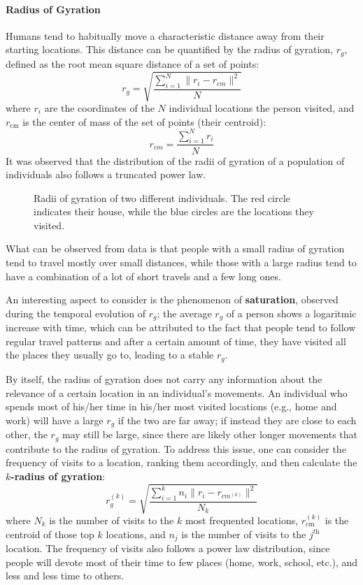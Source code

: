 \paragraph{Radius of Gyration}
Humans tend to habitually move a characteristic distance away from their starting locations. This distance can be quantified by the radius of gyration, $r_g$, defined as the root mean square distance of a set of points:
\begin{equation*}
    r_g = \sqrt{\frac{\sum_{i=1}^{N} \| r_i - r_{\textit{cm}} \|^2}{N}}
\end{equation*}
where $r_i$ are the coordinates of the $N$ individual locations the person visited, and $r_{\text{cm}}$ is the center of mass of the set of points (their centroid):
\begin{equation}
    r_{\textit{cm}} = \frac{\sum_{i=1}^{N} r_i}{N} 
\end{equation}
It was observed that the distribution of the radii of gyration of a population of individuals also follows a truncated power law.
\begin{figure}[H]
    \centering
    
    \caption{Radii of gyration of two different individuals. The red circle indicates their house, while the blue circles are the locations they visited.}
\end{figure}
What can be observed from data is that people with a small radius of gyration tend to travel mostly over small distances, while those with a large radius tend to have a combination of a lot of short travels and a few long ones.

An interesting aspect to consider is the phenomenon of \textbf{saturation}, observed during the temporal evolution of $r_g$; the average $r_g$ of a person shows a logaritmic increase with time, which can be attributed to the fact that people tend to follow regular travel patterns and after a certain amount of time, they have visited all the places they usually go to, leading to a stable $r_g$.

By itself, the radius of gyration does not carry any information about the relevance of a certain location in an individual's movements. An individual who spends most of his/her time in his/her most visited locations (e.g., home and work) will have a large $r_g$ if the two are far away; if instead they are close to each other, the $r_g$ may still be large, since there are likely other longer movements that contribute to the radius of gyration. To address this issue, one can consider the frequency of visits to a location, ranking them accordingly, and then calculate the \textbf{$k$-radius of gyration}:
\begin{equation*}
    r_g^{(k)} = \sqrt{\frac{\sum_{i=1}^k n_i \|r_i - r_{\textit{cm}^{(k)}}\|^2}{N_k}}
\end{equation*}
where $N_k$ is the number of visits to the $k$ most frequented locations, $r_{\text{cm}}^{(k)}$ is the centroid of those top $k$ locations, and $n_j$ is the number of visits to the $j^{\textit{th}}$ location. The frequency of visits also follows a power law distribution, since people will devote most of their time to few places (home, work, school, etc.), and less and less time to others.

